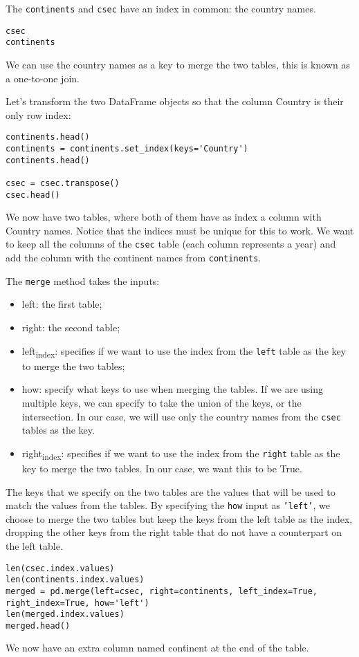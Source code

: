 \documentclass[12pt, a4paper]{article}
\begin{document}
The \texttt{continents} and \texttt{csec} have an index in common: the country names.
\lstset{language=jupyter-python,label= ,caption= ,captionpos=b,numbers=none}
\begin{lstlisting}
csec
continents
\end{lstlisting}
We can use the country names as a key to merge the two tables, this is known as a one-to-one join.

Let's transform the two DataFrame objects so that the column Country is their only row index:
\lstset{language=jupyter-python,label= ,caption= ,captionpos=b,numbers=none}
\begin{lstlisting}
continents.head()
continents = continents.set_index(keys='Country')
continents.head()

csec = csec.transpose()
csec.head()
\end{lstlisting}
We now have two tables, where both of them have as index a column with Country names.
Notice that the indices must be unique for this to work.
We want to keep all the columns of the \texttt{csec} table (each column represents a year) and add the column with the continent names from \texttt{continents}.

The \texttt{merge} method takes the inputs:
\begin{itemize}
\item left: the first table;
\item right: the second table;
\item left\textsubscript{index}: specifies if we want to use the index from the \texttt{left} table as the key to merge the two tables;
\item how: specify what keys to use when merging the tables. If we are using multiple keys, we can specify to take the union of the keys, or the intersection. In our case, we will use only the country names from the \texttt{csec} tables as the key.
\item right\textsubscript{index}: specifies if we want to use the index from the \texttt{right} table as the key to merge the two tables. In our case, we want this to be True.
\end{itemize}
The keys that we specify on the two tables are the values that will be used to match the values from the tables.
By specifying the \texttt{how} input as \texttt{'left'}, we choose to merge the two tables but keep the keys from the left table as the index, dropping the other keys from the right table that do not have a counterpart on the left table.
\lstset{language=jupyter-python,label= ,caption= ,captionpos=b,numbers=none}
\begin{lstlisting}
len(csec.index.values)
len(continents.index.values)
merged = pd.merge(left=csec, right=continents, left_index=True, right_index=True, how='left')
len(merged.index.values)
merged.head()
\end{lstlisting}
We now have an extra column named continent at the end of the table.
\end{document}
